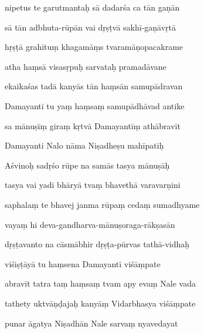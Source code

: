 nipetus te garutmantaḥ sā dadarśa ca tān gaṇān \dd

sā tān adbhuta-rūpān vai dṛṣṭvā sakhī-gaṇāvṛtā \da

hṛṣṭā grahītuṃ khagamāṃs tvaramāṇopacakrame \dd

atha haṃsā visasṛpuḥ sarvataḥ pramadāvane \da

ekaikaśas tadā kanyās tān haṃsān samupādravan \dd

Damayantī tu yaṃ haṃsaṃ samupādhāvad antike \da

sa mānuṣīṃ giraṃ kṛtvā Damayantīṃ athābravīt \dd

Damayanti Nalo nāma Niṣadheṣu mahīpatiḥ \da

Aśvinoḥ sadṛśo rūpe na samās tasya mānuṣāḥ \dd

tasya vai yadi bhāryā tvaṃ bhavethā varavarṇini \da

saphalaṃ te bhavej janma rūpaṃ cedaṃ sumadhyame \dd

vayaṃ hi deva-gandharva-mānuṣoraga-rākṣasān \da

dṛṣṭavanto na cāsmābhir dṛṣṭa-pūrvas tathā-vidhaḥ \dd

viśiṣṭāyā tu haṃsena Damayantī viśāṃpate \da

abravīt tatra taṃ haṃsaṃ tvam apy evaṃ Nale vada \dd

tathety uktvāṇḍajaḥ kanyāṃ Vidarbhasya viśāṃpate \da

punar āgatya Niṣadhān Nale sarvaṃ nyavedayat \dd



\newpage
\theendnotes

